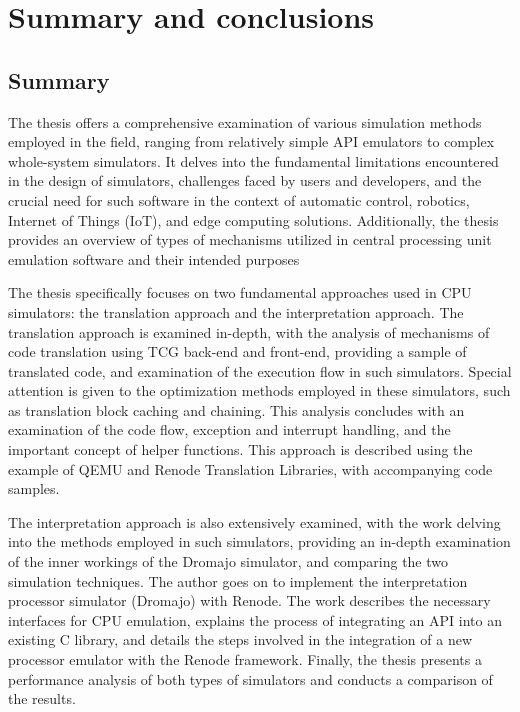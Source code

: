 
\chapter{Summary and conclusions}

\section{Summary}

The thesis offers a comprehensive examination of various simulation methods employed in the field, ranging from
relatively simple API emulators to complex whole-system simulators. It delves into the fundamental limitations
encountered in the design of simulators, challenges faced by users and developers, and the crucial need for such
software in the context of automatic control, robotics, Internet of Things (IoT), and edge computing solutions.
Additionally, the thesis provides an overview of types of mechanisms utilized in central processing unit emulation
software and their intended purposes

The thesis specifically focuses on two fundamental approaches used in CPU simulators: the translation approach and the
interpretation approach. The translation approach is examined in-depth, with the analysis of mechanisms of code
translation using TCG back-end and front-end, providing a sample of translated code, and examination of the execution flow
in such simulators. Special attention is given to the optimization methods employed in these simulators, such as
translation block caching and chaining. This analysis concludes with an examination of the code flow, exception and
interrupt handling, and the important concept of helper functions. This approach is described using the example of QEMU
and Renode Translation Libraries, with accompanying code samples.

The interpretation approach is also extensively examined, with the work delving into the methods employed in such
simulators, providing an in-depth examination of the inner workings of the Dromajo simulator, and comparing the two
simulation techniques. The author goes on to implement the interpretation processor simulator (Dromajo) with Renode.
The work describes the necessary interfaces for CPU emulation, explains
the process of integrating an API into an existing C library, and details the steps involved in the integration of a new
processor emulator with the Renode framework. Finally, the thesis presents a performance analysis of both types of
simulators and conducts a comparison of the results.

